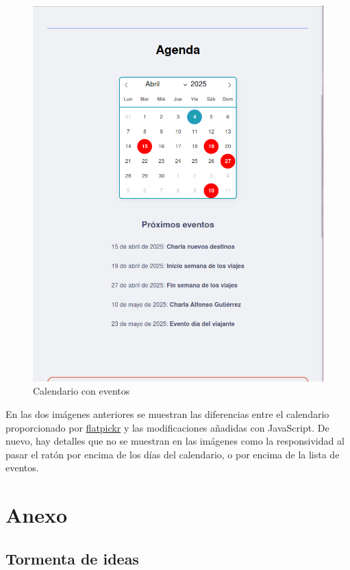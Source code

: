 \documentclass[11pt, a4paper]{book}
\begin{document}
	\begin{figure} [H]
		\centering
		\includegraphics[height=0.4\textheight]{CSS/3 extra2.png}
		\caption{Calendario con eventos}
	\end{figure}
	

	En las dos imágenes anteriores se muestran las diferencias entre el calendario proporcionado por \href{https://flatpickr.js.org/}{flatpickr} y las modificaciones añadidas con JavaScript. De nuevo, hay detalles que no se muestran en las imágenes como la responsividad al pasar el ratón por encima de los días del calendario, o por encima de la lista de eventos.
	
	
	
	\chapter{Anexo}
	\label{chap:anexo1}
	\section{Tormenta de ideas}
	
\end{document}
